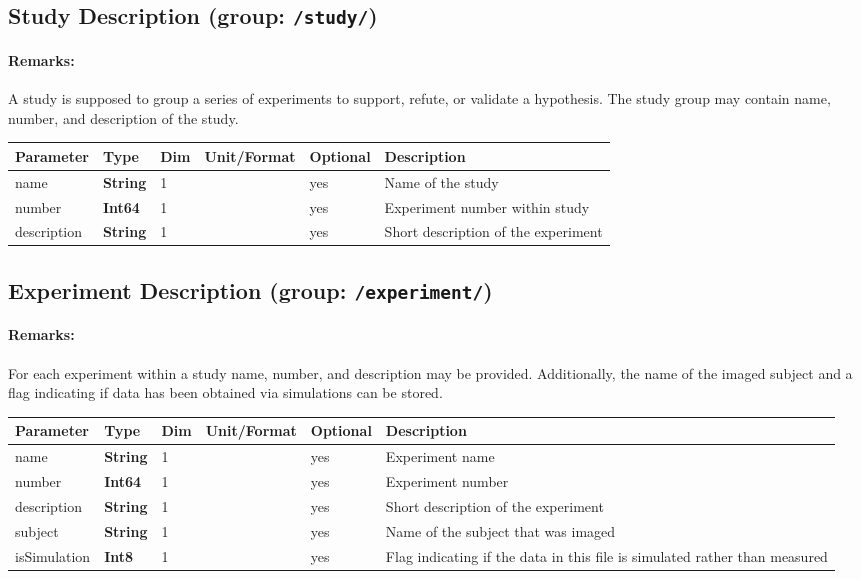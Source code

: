 \documentclass[landscape,a4paper]{article} %
\newcommand{\inl}[1]{\lstinline[columns=fixed]{#1}}
\newcommand{\inltab}[1]{{\ttfamily\bfseries\color{blue}#1}}
\newcommand{\inlvar}[1]{{\ttfamily#1}}
\begin{document}
\subsection{Study Description (group: \inl{/study/})}

\begin{multicols}{2}
	\paragraph{Remarks:} A study is supposed to group a series of experiments to support, refute, or validate a hypothesis. The study group may contain \inlvar{name}, \inlvar{number}, and \inlvar{description} of the study.
\end{multicols}

\noindent \begin{tabularx}{\columnwidth}{lllllX} 
\textbf{Parameter} & \textbf{Type} & \textbf{Dim} & \textbf{Unit/Format} & \textbf{Optional} & \textbf{Description} \\ \hline 
\inlvar{name} & \inltab{String} & 1 & & yes & Name of the study \\ \hline
\inlvar{number} & \inltab{Int64} & 1 & & yes & Experiment number within study \\ \hline
\inlvar{description} & \inltab{String} & 1 & & yes & Short description of the experiment \\ \hline
\end{tabularx}


\subsection{Experiment Description (group: \inl{/experiment/})}

\begin{multicols}{2}
\paragraph{Remarks:} For each experiment within a study \inlvar{name}, \inlvar{number}, and \inlvar{description} may be provided. Additionally, the name of the imaged subject and a flag indicating if data has been obtained via simulations can be stored.
\end{multicols}

\noindent \begin{tabularx}{\columnwidth}{lllllX} 
\textbf{Parameter} & \textbf{Type} & \textbf{Dim} & \textbf{Unit/Format} & \textbf{Optional} & \textbf{Description} \\ \hline 
\inlvar{name} & \inltab{String} & 1 & & yes & Experiment name \\ \hline
\inlvar{number} & \inltab{Int64} & 1 & & yes & Experiment number\\ \hline
\inlvar{description} & \inltab{String} & 1 & & yes & Short description of the experiment \\ \hline
\inlvar{subject} & \inltab{String} & 1 & & yes & Name of the subject that was imaged \\ \hline 
\inlvar{isSimulation} & \inltab{Int8} & 1 & & yes & Flag indicating if the data in this file is simulated rather than measured \\ \hline
\end{tabularx}
\end{document}

